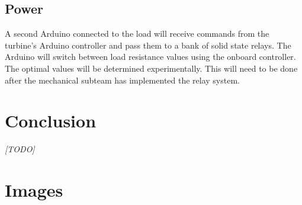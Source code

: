 \documentclass[11pt,letterpaper,conference]{IEEEtran}
\begin{document}
\subsection{Power}

A second Arduino connected to the load will receive commands from the turbine's
Arduino controller and pass them to a bank of solid state relays. The
Arduino will switch between load resistance values using the onboard
controller. The optimal values will be determined experimentally. This will
need to be done after the mechanical subteam has implemented the relay system.

\section{Conclusion}

\emph{[TODO]}
\balance

\raggedright
\printbibliography

\clearpage
\onecolumn
\appendices
\section{Images}
\label{apx:images}
\end{document}
